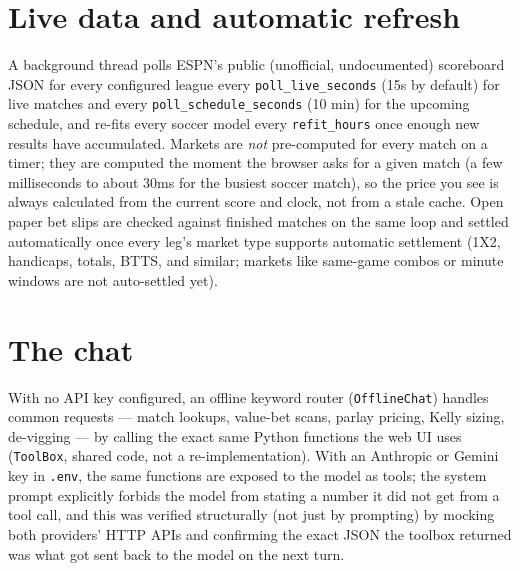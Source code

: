 \documentclass[11pt]{article}
\begin{document}
\section{Live data and automatic refresh}
A background thread polls ESPN's public (unofficial, undocumented) scoreboard JSON for every
configured league every \texttt{poll\_live\_seconds} (15s by default) for live matches and every
\texttt{poll\_schedule\_seconds} (10 min) for the upcoming schedule, and re-fits every soccer
model every \texttt{refit\_hours} once enough new results have accumulated. Markets are
\emph{not} pre-computed for every match on a timer; they are computed the moment the browser asks
for a given match (a few milliseconds to about 30ms for the busiest soccer match), so the price
you see is always calculated from the current score and clock, not from a stale cache. Open paper
bet slips are checked against finished matches on the same loop and settled automatically once
every leg's market type supports automatic settlement (1X2, handicaps, totals, BTTS, and similar;
markets like same-game combos or minute windows are not auto-settled yet).

\section{The chat}
\label{sec:chat}
With no API key configured, an offline keyword router (\texttt{OfflineChat}) handles common
requests --- match lookups, value-bet scans, parlay pricing, Kelly sizing, de-vigging --- by
calling the exact same Python functions the web UI uses (\texttt{ToolBox}, shared code, not a
re-implementation). With an Anthropic or Gemini key in \texttt{.env}, the same functions are
exposed to the model as tools; the system prompt explicitly forbids the model from stating a
number it did not get from a tool call, and this was verified structurally (not just by prompting)
by mocking both providers' HTTP APIs and confirming the exact JSON the toolbox returned was what
got sent back to the model on the next turn.
\end{document}
